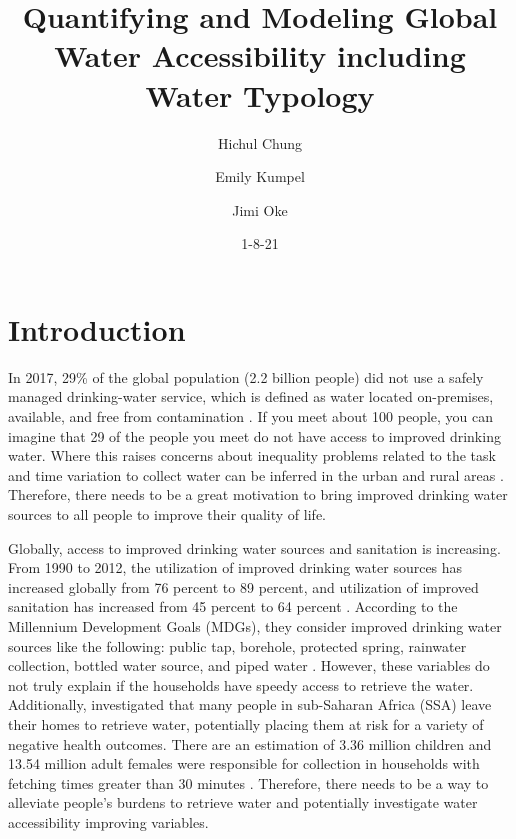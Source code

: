 \documentclass[10pt,twoside]{article}
\numberwithin{equation}{section}
\newcommand{\?}{\stackrel{?}{=}}
\begin{document}
\vspace{-3ex}
\title{Quantifying and Modeling Global Water Accessibility including Water Typology}
\author{Hichul Chung \and Emily Kumpel \and Jimi Oke}
\date{1-8-21}
\maketitle



\section{Introduction}
In 2017, 29\% of the global population (2.2 billion people) did not use a safely managed drinking-water service, which is defined as water located on-premises, available, and free from contamination \citep{whoDrinkingwater}.   If you meet about 100 people, you can imagine that 29 of the people you meet do not have access to improved drinking water. Where this raises concerns about inequality problems related to the task and time variation 
to collect water can be inferred in the urban and rural areas \citep{cassiviAccessDrinkingWater2018}. Therefore, there needs to be a
great motivation to bring improved drinking water sources to all people to improve their quality of life.


Globally, access to improved drinking water sources and sanitation is increasing. From 1990 to 2012, the utilization of
improved drinking water sources has increased globally from 76 percent to 89 percent, and utilization of improved
sanitation has increased from 45 percent to 64 percent \citep{fullerTrackingProgressGlobal2016}. According to the Millennium Development Goals (MDGs),
they consider improved drinking water sources like the following: public tap, borehole, protected spring, rainwater
collection, bottled water source, and piped water \citep{bartramGlobalMonitoringWater2014}. However, these variables do not truly
explain if the households have speedy access to retrieve the water. Additionally, \citet{grahamAnalysisWaterCollection2016} investigated that many people in sub-Saharan Africa (SSA) leave their homes to retrieve water, potentially placing them at risk for a variety of negative health outcomes. There are an estimation of 3.36 million children and 13.54 million adult females were responsible for collection in households with fetching times greater than 30 minutes \citep{grahamAnalysisWaterCollection2016}. Therefore, there needs to be a way to alleviate people's burdens to retrieve water and potentially investigate water accessibility improving variables. 
\end{document}
